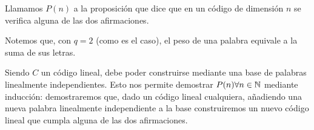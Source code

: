 
Llamamos $P(n)$ a la proposición que dice que en un código de dimensión $n$ se verifica alguna de las dos afirmaciones.

Notemos que, con $q = 2$ (como es el caso), el peso de una palabra equivale a la suma de sus letras.

Siendo $C$ un código lineal, debe poder construirse mediante una base de palabras linealmente independientes. Esto nos permite demostrar $P(n)\forall n\in\mathbb{N}$ mediante inducción: demostraremos que, dado un código lineal cualquiera, añadiendo una nueva palabra linealmente independiente a la base construiremos un nuevo código lineal que cumpla alguna de las dos afirmaciones.

